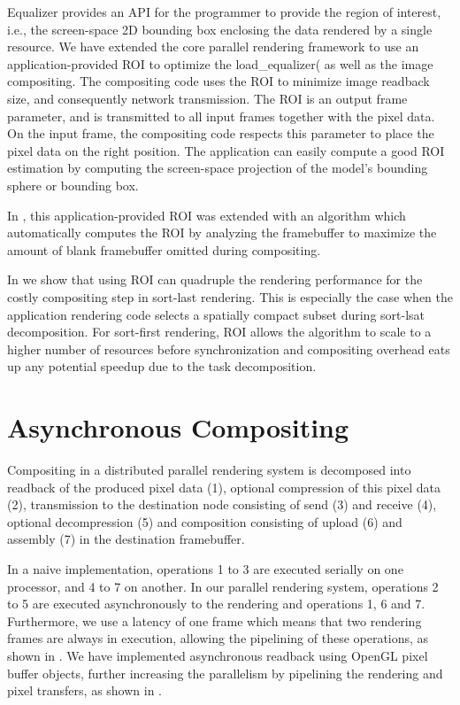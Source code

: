Equalizer provides an API for the programmer to provide the region of interest,
i.e., the screen-space 2D bounding box enclosing the data rendered by a single
resource. We have extended the core parallel rendering framework to use an
application-provided ROI to optimize the \textsf{load\_equalizer}(
as well as the image compositing. The compositing code uses the ROI to minimize
image readback size, and consequently network transmission. The ROI is an output
frame parameter, and is transmitted to all input frames together with the pixel
data. On the input frame, the compositing code respects this parameter to place
the pixel data on the right position. The application can easily compute a good
ROI estimation by computing the screen-space projection of the model's bounding
sphere or bounding box.

In \cite{MEP:10}, this application-provided ROI was extended with an algorithm
which automatically computes the ROI by analyzing the framebuffer to maximize
the amount of blank framebuffer omitted during compositing.

In \cite{EBAHMP:12} we show that using ROI can quadruple the rendering
performance for the costly compositing step in sort-last rendering. This is
especially the case when the application rendering code selects a spatially
compact subset during sort-lsat decomposition. For sort-first rendering, ROI
allows the algorithm to scale to a higher number of resources before
synchronization and compositing overhead eats up any potential speedup due to
the task decomposition.

\section{Asynchronous Compositing}

Compositing in a distributed parallel rendering system is decomposed into
readback of the produced pixel data (1), optional compression of this pixel data
(2), transmission to the destination node consisting of send (3) and receive
(4), optional decompression (5) and composition consisting of upload (6) and
assembly (7) in the destination framebuffer.

In a naive implementation, operations 1 to 3 are executed serially on one
processor, and 4 to 7 on another. In our parallel rendering system, operations 2
to 5 are executed asynchronously to the rendering and operations 1, 6 and 7.
Furthermore, we use a latency of one frame which means that two rendering frames
are always in execution, allowing the pipelining of these operations, as shown
in . We have implemented asynchronous readback using OpenGL pixel
buffer objects, further increasing the parallelism by pipelining the rendering
and pixel transfers, as shown in .

